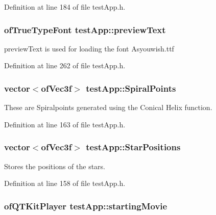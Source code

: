 Definition at line 184 of file test\-App.\-h.

\hypertarget{classtest_app_af5b1af55af2256ef3751de075fc7a9cc}{
\subsubsection[{preview\-Text}]{\setlength{\rightskip}{0pt plus 5cm}of\-True\-Type\-Font test\-App\-::preview\-Text}}\label{classtest_app_af5b1af55af2256ef3751de075fc7a9cc}


preview\-Text is used for loading the font Asyouwish.\-ttf 



Definition at line 262 of file test\-App.\-h.

\hypertarget{classtest_app_af0dd2f3e3aabdb43bee49d74c156dc05}{
\subsubsection[{Spiral\-Points}]{\setlength{\rightskip}{0pt plus 5cm}vector$<$of\-Vec3f$>$ test\-App\-::\-Spiral\-Points}}\label{classtest_app_af0dd2f3e3aabdb43bee49d74c156dc05}


These are Spiralpoints generated using the Conical Helix function. 



Definition at line 163 of file test\-App.\-h.

\hypertarget{classtest_app_a68d0d30cea64a9d39a1b2deef16677ad}{
\subsubsection[{Star\-Positions}]{\setlength{\rightskip}{0pt plus 5cm}vector$<$of\-Vec3f$>$ test\-App\-::\-Star\-Positions}}\label{classtest_app_a68d0d30cea64a9d39a1b2deef16677ad}


Stores the positions of the stars. 



Definition at line 158 of file test\-App.\-h.

\hypertarget{classtest_app_a9bfe7793fa0689a991ff64174745c38f}{
\subsubsection[{starting\-Movie}]{\setlength{\rightskip}{0pt plus 5cm}of\-Q\-T\-Kit\-Player test\-App\-::starting\-Movie}}\label{classtest_app_a9bfe7793fa0689a991ff64174745c38f}


